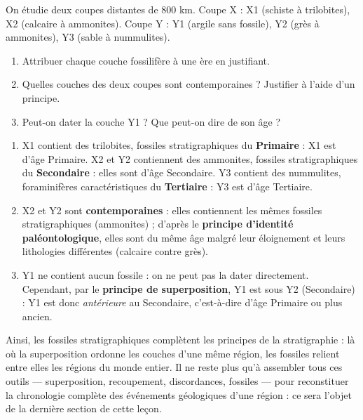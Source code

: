 \documentclass[11pt]{article}
\begin{document}
\begin{exercice}
On étudie deux coupes distantes de 800 km. Coupe X : X1 (schiste à trilobites), X2 (calcaire à ammonites). Coupe Y : Y1 (argile sans fossile), Y2 (grès à ammonites), Y3 (sable à nummulites).
\begin{enumerate}
\item Attribuer chaque couche fossilifère à une ère en justifiant.
\item Quelles couches des deux coupes sont contemporaines ? Justifier à l'aide d'un principe.
\item Peut-on dater la couche Y1 ? Que peut-on dire de son âge ?
\end{enumerate}
\end{exercice}

\begin{corrige}
\begin{enumerate}
\item X1 contient des trilobites, fossiles stratigraphiques du \textbf{Primaire} : X1 est d'âge Primaire. X2 et Y2 contiennent des ammonites, fossiles stratigraphiques du \textbf{Secondaire} : elles sont d'âge Secondaire. Y3 contient des nummulites, foraminifères caractéristiques du \textbf{Tertiaire} : Y3 est d'âge Tertiaire.
\item X2 et Y2 sont \textbf{contemporaines} : elles contiennent les mêmes fossiles stratigraphiques (ammonites) ; d'après le \textbf{principe d'identité paléontologique}, elles sont du même âge malgré leur éloignement et leurs lithologies différentes (calcaire contre grès).
\item Y1 ne contient aucun fossile : on ne peut pas la dater directement. Cependant, par le \textbf{principe de superposition}, Y1 est sous Y2 (Secondaire) : Y1 est donc \emph{antérieure} au Secondaire, c'est-à-dire d'âge Primaire ou plus ancien.
\end{enumerate}
\end{corrige}

Ainsi, les fossiles stratigraphiques complètent les principes de la stratigraphie : là où la superposition ordonne les couches d'une même région, les fossiles relient entre elles les régions du monde entier. Il ne reste plus qu'à assembler tous ces outils — superposition, recoupement, discordances, fossiles — pour reconstituer la chronologie complète des événements géologiques d'une région : ce sera l'objet de la dernière section de cette leçon.
\end{document}
